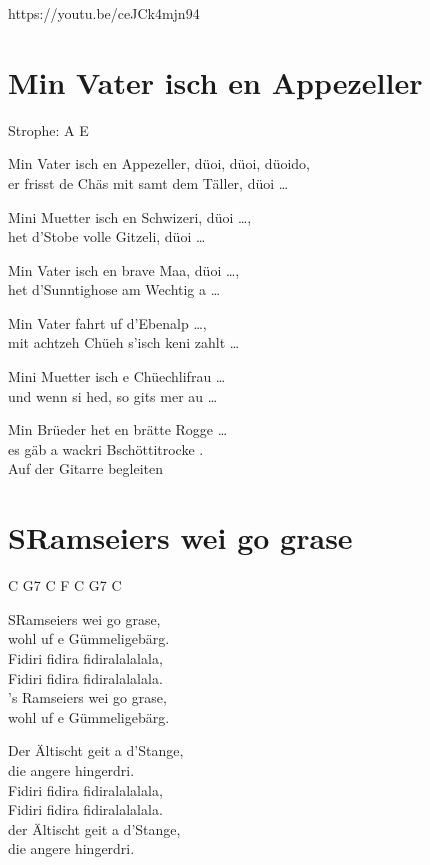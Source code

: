 \documentclass[
  letterpaper,
]{scrbook}
\begin{document}
https://youtu.be/ceJCk4mjn94

\hypertarget{min-vater-isch-en-appezeller}{%
\chapter{Min Vater isch en
Appezeller}\label{min-vater-isch-en-appezeller}}

Strophe: A E

Min Vater isch en Appezeller, düoi, düoi, düoido,\\
er frisst de Chäs mit samt dem Täller, düoi \ldots{}

Mini Muetter isch en Schwizeri, düoi \ldots,\\
het d'Stobe volle Gitzeli, düoi \ldots{}

Min Vater isch en brave Maa, düoi \ldots,\\
het d'Sunntighose am Wechtig a \ldots{}

Min Vater fahrt uf d'Ebenalp \ldots,\\
mit achtzeh Chüeh s'isch keni zahlt \ldots{}

Mini Muetter isch e Chüechlifrau \ldots{}\\
und wenn si hed, so git\textquotesingle s mer au \ldots{}

Min Brüeder het en brätte Rogge \ldots{}\\
es gäb a wackri Bschöttitrocke .\\
Auf der Gitarre begleiten

\hypertarget{sramseiers-wei-go-grase}{%
\chapter{S\textquotesingle Ramseiers wei go
grase}\label{sramseiers-wei-go-grase}}

C G7 C F C G7 C

S\textquotesingle Ramseiers wei go grase,\\
wohl uf e Gümmeligebärg.\\
Fidiri fidira fidiralalalala,\\
Fidiri fidira fidiralalalala.\\
's Ramseiers wei go grase,\\
wohl uf e Gümmeligebärg.

Der Ältischt geit a d'Stange,\\
die angere hingerdri.\\
Fidiri fidira fidiralalalala,\\
Fidiri fidira fidiralalalala.\\
der Ältischt geit a d'Stange,\\
die angere hingerdri.
\end{document}
